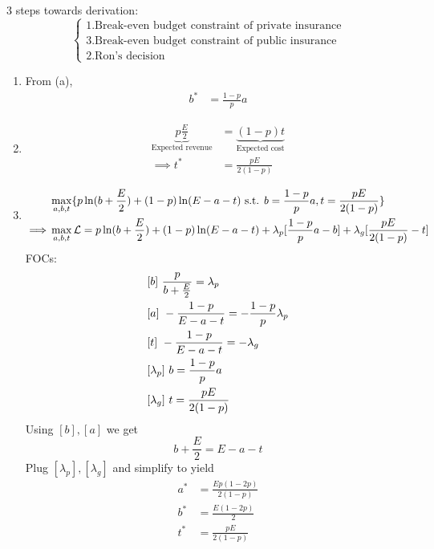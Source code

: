 \documentclass[
]{article}
\begin{document}
3 steps towards derivation:
\[\begin{cases} 1. \text{Break-even budget constraint of private insurance} \\
3. \text{Break-even budget constraint of public insurance} \\
 2. \text{Ron's decision} \end{cases}\]

\begin{enumerate} 
\item 
From (a), 
$$\begin{aligned} 
b^ * &= \frac{1-p}{p}a
\end{aligned}$$ 

\item
$$\begin{aligned} 
\underbrace{p\frac{E}{2}}_{\text{Expected revenue}} &= \underbrace{(1-p)t}_{\text{Expected cost}} \\
\implies t^ * &= \frac{pE}{2(1-p)}
\end{aligned}$$

\item 
$$\begin{aligned}
&\max_{a, b, t} \{ p\ln (b + \frac{E}{2}) + (1-p) \ln (E-a-t) \space \text{  s.t.  } \space b = \frac{1-p}{p}a, \space t = \frac{pE}{2(1-p)} \} \\
\implies & \max_{a, b, t} \mathcal{L}= p\ln (b + \frac{E}{2}) + (1-p) \ln (E-a-t) +  \lambda_p [\frac{1-p}{p}a - b] + \lambda_g[\frac{pE}{2(1-p)} - t]
\end{aligned}$$  
FOCs: 
$$\begin{aligned}
&[b] \space \text{ } \frac{p}{b+\frac{E}{2}} = \lambda _p\\
&[a] \space \text{ }-\frac{1-p}{E-a -t} = -\frac{1-p}{p}\lambda _p \\
&[t]\space \text{ }-\frac{1-p}{E-a -t} = -\lambda_g \\
&[\lambda_p ] \text{ }\space b = \frac{1-p}{p}a \\
&[\lambda_g] \text{ }\space t = \frac{pE}{2(1-p)}
\end{aligned}$$
Using $[b], [a]$ we get  
$$b + \frac{E}{2} = E - a - t$$
Plug $[\lambda_p ], [\lambda_g]$ and simplify to yield
$$\begin{aligned} 
a^ * &= \frac{Ep(1-2p)}{2(1-p)} \\
b ^* &= \frac{E(1-2p)}{2} \\
t ^ * &= \frac{pE}{2(1-p)}
\end{aligned}$$

\end{enumerate}
\end{document}
